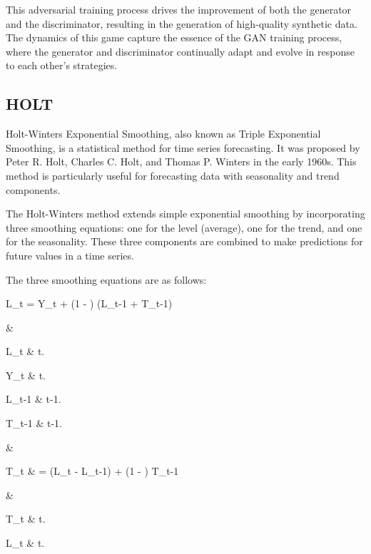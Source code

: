 \documentclass{ieeeojies}
\begin{document}
This adversarial training process drives the improvement of both the generator and the discriminator, resulting in the generation of high-quality synthetic data. The dynamics of this game capture the essence of the GAN training process, where the generator and discriminator continually adapt and evolve in response to each other's strategies.

\subsection{HOLT}

Holt-Winters Exponential Smoothing, also known as Triple Exponential Smoothing, is a statistical method for time series forecasting. It was proposed by Peter R. Holt, Charles C. Holt, and Thomas P. Winters in the early 1960s. This method is particularly useful for forecasting data with seasonality and trend components.

The Holt-Winters method extends simple exponential smoothing by incorporating three smoothing equations: one for the level (average), one for the trend, and one for the seasonality. These three components are combined to make predictions for future values in a time series.

The three smoothing equations are as follows:

L_t = \alpha \cdot Y_t + (1 - \alpha) \cdot (L_{t-1} + T_{t-1})

 \quad & 

\hspace{0.5cm}L_t &  t.

\hspace{0.5cm}Y_t &  t.

\hspace{0.5cm}L_{t-1} &  t-1.

\hspace{0.5cm}T_{t-1} &  t-1.

\hspace{0.5cm}\alpha & 


T_t & = \beta \cdot (L_t - L_{t-1}) + (1 - \beta) \cdot T_{t-1} 

 \quad & 

\hspace{0.5cm}T_t &  t.

\hspace{0.5cm}L_t &  t.
\end{document}
